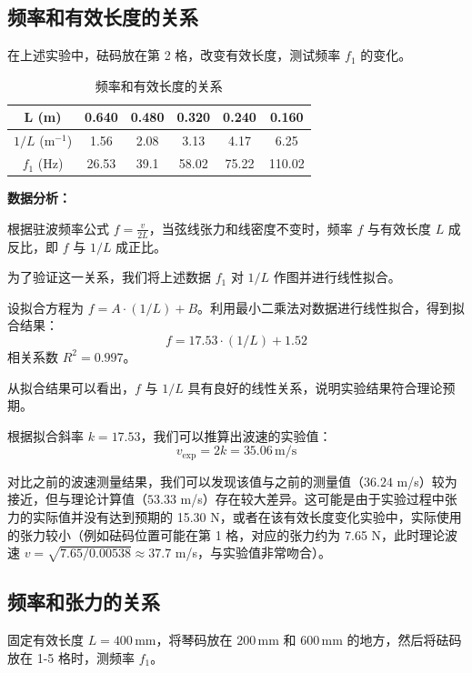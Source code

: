 \documentclass[11pt]{article}
\begin{document}
\subsection{频率和有效长度的关系}

在上述实验中，砝码放在第 2 格，改变有效长度，测试频率 $f_1$ 的变化。

\begin{table}[h]
    \centering
    \caption{频率和有效长度的关系}
    \label{tab:freq_length}
    \begin{tabular}{cccccc}
        \toprule
        L (m) & 0.640 & 0.480 & 0.320 & 0.240 & 0.160 \\
        \midrule
        $1/L$ (m$^{-1}$) & 1.56 & 2.08 & 3.13 & 4.17 & 6.25 \\
        $f_1$ (Hz) & 26.53 & 39.1 & 58.02 & 75.22 & 110.02 \\
        \bottomrule
    \end{tabular}
\end{table}

\textbf{数据分析：}

根据驻波频率公式 $f = \frac{v}{2L}$，当弦线张力和线密度不变时，频率 $f$ 与有效长度 $L$ 成反比，即 $f$ 与 $1/L$ 成正比。

为了验证这一关系，我们将上述数据 $f_1$ 对 $1/L$ 作图并进行线性拟合。

设拟合方程为 $f = A \cdot (1/L) + B$。利用最小二乘法对数据进行线性拟合，得到拟合结果：
$$ f = 17.53 \cdot (1/L) + 1.52 $$
相关系数 $R^2 = 0.997$。

从拟合结果可以看出，$f$ 与 $1/L$ 具有良好的线性关系，说明实验结果符合理论预期。

根据拟合斜率 $k = 17.53$，我们可以推算出波速的实验值：
$$ v_{\text{exp}} = 2k = 35.06 \, \text{m/s} $$

对比之前的波速测量结果，我们可以发现该值与之前的测量值（$36.24$ m/s）较为接近，但与理论计算值（$53.33$ m/s）存在较大差异。这可能是由于实验过程中张力的实际值并没有达到预期的 15.30 N，或者在该有效长度变化实验中，实际使用的张力较小（例如砝码位置可能在第 1 格，对应的张力约为 7.65 N，此时理论波速 $v = \sqrt{7.65/0.00538} \approx 37.7$ m/s，与实验值非常吻合）。


\subsection{频率和张力的关系}

固定有效长度 $L=400\,\text{mm}$，将琴码放在 $200\,\text{mm}$ 和 $600\,\text{mm}$ 的地方，然后将砝码放在 1-5 格时，测频率 $f_1$。
\end{document}
